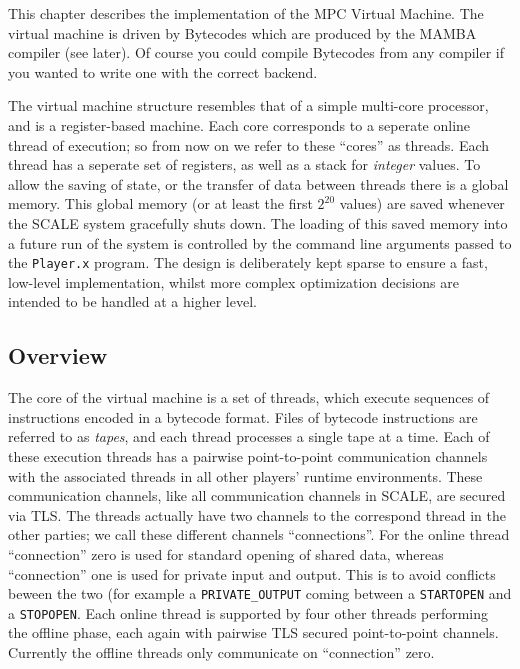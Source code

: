 
\label{ch:vm}

This chapter describes the implementation of the
MPC Virtual Machine. 
The virtual machine is driven by Bytecodes which
are produced by the MAMBA compiler (see later).
Of course you could compile Bytecodes from any compiler
if you wanted to write one with the correct backend.

The virtual machine structure resembles that of a
simple multi-core processor, and is a register-based
machine.
Each core corresponds to a seperate online thread
of execution; so from now on we refer to these ``cores''
as threads.
Each thread has a seperate set of registers, as
well as a stack for {\em integer} values.
To allow the saving of state, or the transfer of data
between threads there is a global memory.
This global memory (or at least the first $2^{20}$
values) are saved whenever the SCALE system gracefully
shuts down.
The loading of this saved memory into a future run of the
system is controlled by the command line arguments
passed to the \verb+Player.x+ program.
The design is deliberately kept sparse to ensure a fast, low-level 
implementation, whilst more complex optimization decisions are intended 
to be handled at a higher level.

\subsection{Overview}

The core of the virtual machine is a set of threads, which
execute sequences of instructions encoded in a bytecode format.
Files of bytecode instructions are referred to as \emph{tapes},
and each thread processes a single tape at a time.
Each of these execution threads has a pairwise point-to-point
communication channels with the associated threads in all
other players' runtime environments.
These communication channels, like all communication channels
in SCALE, are secured via TLS.
The threads actually have two channels to the correspond
thread in the other parties; we call these different channels
``connections''.
For the online thread ``connection'' zero is used for standard
opening of shared data, whereas ``connection'' one is used for
private input and output. This is to avoid conflicts beween
the two (for example a \verb+PRIVATE_OUTPUT+ coming between
a \verb+STARTOPEN+ and a \verb+STOPOPEN+.
Each online thread is supported by four other threads
performing the offline phase, each again with pairwise 
TLS secured point-to-point channels. Currently the offline
threads only communicate on ``connection'' zero.

